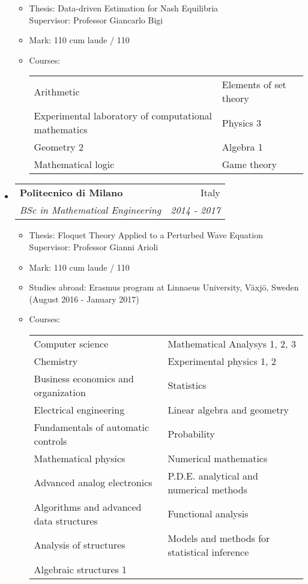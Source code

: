 \documentclass[letterpaper,11pt]{article}
\makeatletter
\newcommand{\resitem}[1]{\item #1 \vspace{-2pt}}
\newcommand{\ressubheading}[4]{
\begin{tabular*}{6.5in}{l@{\cftdotfill{\cftsecdotsep}\extracolsep{\fill}}r}
		\textbf{#1} & #2 \\
		\textit{#3} & \textit{#4} \\
\end{tabular*}\vspace{-6pt}}
\makeatother
\begin{document}
\begin{itemize}
\begin{itemize}
	\resitem{Thesis: Data-driven Estimation for Nash Equilibria \\
	Supervisor: Professor Giancarlo Bigi}
	\resitem{Mark: 110 cum laude / 110}
	\resitem{Courses:\\ \begin{tabular}{p{}@{\hskip 2em} p{0.4 \textwidth}}
	Arithmetic & Elements of set theory \\
	Experimental laboratory of computational mathematics & Physics 3 \\
	Geometry 2 & Algebra 1 \\
	Mathematical logic & Game theory
	
	\end{tabular}}
\end{itemize}

\item[] \ressubheading{Politecnico di Milano}{Italy}{BSc in Mathematical Engineering}{2014 - 2017}

\begin{itemize}
	\resitem{Thesis: Floquet Theory Applied to a Perturbed Wave Equation \\
	Supervisor: Professor Gianni Arioli}
	\resitem{Mark: 110 cum laude / 110}
	\resitem{Studies abroad: Erasmus program at Linnaeus University, V\"axj\"o, Sweden (August 2016 - January 2017)}
	\resitem{Courses:\\ \begin{tabular}{p{}@{\hskip 2em} p{0.4 \textwidth}}
	Computer science & Mathematical Analysys 1, 2, 3 \\
	Chemistry & Experimental physics 1, 2 \\
	Business economics and organization & Statistics \\
	Electrical engineering & Linear algebra and geometry\\
	Fundamentals of automatic controls & Probability \\
	Mathematical physics & Numerical mathematics\\
	Advanced analog electronics & P.D.E. analytical and numerical methods \\
	Algorithms and advanced data structures & Functional analysis \\
	Analysis of structures & Models and methods for statistical inference \\
	Algebraic structures 1
	\end{tabular}	 }
\end{itemize}

\end{itemize}
\end{document}
